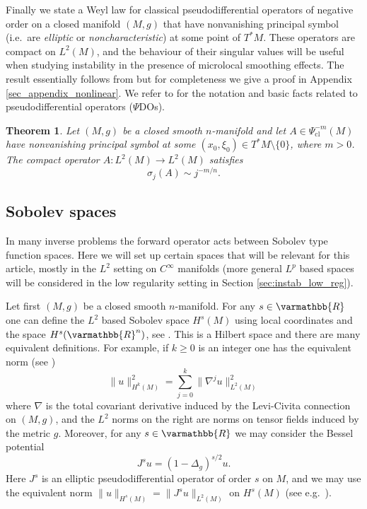 \documentclass[12pt,twoside]{amsart}
\numberwithin{equation}{section}
\renewcommand{\geq}{\geqslant}
\renewcommand{\mathbb}{\varmathbb}
\newtheorem{theorem}{Theorem}[section]
\newcommand{\mR}{\mathbb{R}}                    %
\newcommand{\norm}[1]{\lVert #1 \rVert}         %
\begin{document}
Finally we state a Weyl law for classical pseudodifferential operators of negative order on a closed manifold $(M,g)$ that have nonvanishing principal symbol (i.e.\ are \emph{elliptic} or \emph{noncharacteristic}) at some point of $T^* M$. These operators are compact on $L^2(M)$, and the behaviour of their singular values will be useful when studying instability in the presence of microlocal smoothing effects. The result essentially follows from \cite{BS_psdo1, BS_psdo2, Karol} but for completeness we give a proof in Appendix \ref{sec_appendix_nonlinear}. We refer to \cite[Chapter 18]{Hoermander} for the notation and basic facts related to pseudodifferential operators ($\Psi$DOs).

\begin{theorem} \label{thm_weyl3}
Let $(M,g)$ be a closed smooth $n$-manifold and let $A \in \Psi^{-m}_{\mathrm{cl}}(M)$ have nonvanishing principal symbol at some $(x_0, \xi_0) \in T^* M \setminus \{0\}$, where $m > 0$. The compact operator $A: L^2(M) \to L^2(M)$ satisfies 
\[
\sigma_j(A) \sim j^{-m/n}.
\]
\end{theorem}

\subsection{Sobolev spaces}


In many inverse problems the forward operator acts between Sobolev type function spaces. Here we will set up certain spaces that will be relevant for this article, mostly in the $L^2$ setting on $C^{\infty}$ manifolds (more general $L^p$ based spaces will be considered in the low regularity setting in Section \ref{sec:instab_low_reg}).



Let first $(M,g)$ be a closed smooth $n$-manifold. For any $s \in \mR$ one can define the $L^2$ based Sobolev space $H^s(M)$ using local coordinates and the space $H^s(\mR^n)$, see \cite[Section 4.3 in vol.\ I]{Taylor}. This is a Hilbert space and there are many equivalent definitions. For example, if $k \geq 0$ is an integer one has the equivalent norm (see \cite[Appendix B]{Besse})
\begin{equation} \label{eq:hkm_norm_equivalent}
\norm{u}_{H^k(M)}^2 = \sum_{j=0}^k \norm{\nabla^j u}_{L^2(M)}^2
\end{equation}
where $\nabla$ is the total covariant derivative induced by the Levi-Civita connection on $(M,g)$, and the $L^2$ norms on the right are norms on tensor fields induced by the metric $g$. Moreover, for any $s \in \mR$ we may consider the Bessel potential 
\[
J^s u = (1-\Delta_g)^{s/2} u.
\]
Here $J^s$ is an elliptic pseudodifferential operator of order $s$ on $M$, and we may use the equivalent norm $\norm{u}_{H^s(M)} = \norm{J^s u}_{L^2(M)}$ on $H^s(M)$ (see e.g.\ \cite{Shubin}).
\end{document}
